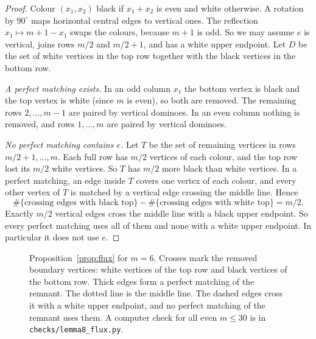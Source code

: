 \begin{proof}
Colour $(x_1,x_2)$ black if $x_1+x_2$ is even and white otherwise. A rotation by $90^\circ$ maps horizontal central edges to vertical ones. The reflection $x_1\mapsto m+1-x_1$ swaps the colours, because $m+1$ is odd. So we may assume $e$ is vertical, joins rows $m/2$ and $m/2+1$, and has a white upper endpoint. Let $D$ be the set of white vertices in the top row together with the black vertices in the bottom row.

\emph{A perfect matching exists.} In an odd column $x_1$ the bottom vertex is black and the top vertex is white (since $m$ is even), so both are removed. The remaining rows $2,\dots,m-1$ are paired by vertical dominoes. In an even column nothing is removed, and rows $1,\dots,m$ are paired by vertical dominoes.

\emph{No perfect matching contains $e$.} Let $T$ be the set of remaining vertices in rows $m/2+1,\dots,m$. Each full row has $m/2$ vertices of each colour, and the top row lost its $m/2$ white vertices. So $T$ has $m/2$ more black than white vertices. In a perfect matching, an edge inside $T$ covers one vertex of each colour, and every other vertex of $T$ is matched by a vertical edge crossing the middle line. Hence
\[
  \#\{\text{crossing edges with black top}\}-\#\{\text{crossing edges with white top}\}=m/2 .
\]
Exactly $m/2$ vertical edges cross the middle line with a black upper endpoint. So every perfect matching uses all of them and none with a white upper endpoint. In particular it does not use $e$.
\end{proof}

\begin{figure}[t]
\centering
{}
\caption{Proposition~\ref{prop:flux} for $m=6$. Crosses mark the removed boundary vertices: white vertices of the top row and black vertices of the bottom row. Thick edges form a perfect matching of the remnant. The dotted line is the middle line. The dashed edges cross it with a white upper endpoint, and no perfect matching of the remnant uses them. A computer check for all even $m\le 30$ is in \texttt{checks/lemma8\_flux.py}.}
\label{fig:flux}
\end{figure}

